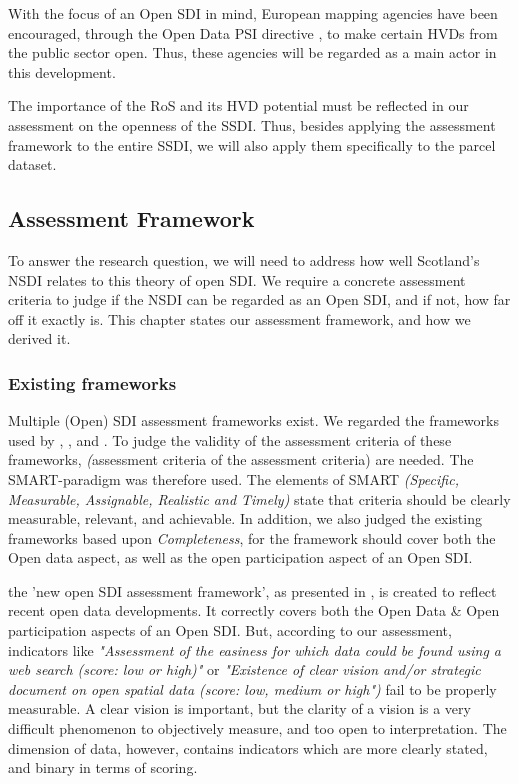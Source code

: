 With the focus of an Open SDI in mind, European mapping agencies have been encouraged, through the Open Data PSI directive \citep{open_data_directive_2019}, to make certain HVDs from the public sector open. Thus, these agencies will be regarded as a main actor in this development. 

The importance of the RoS and its HVD potential must be reflected in our assessment on the openness of the SSDI. Thus, besides applying the assessment framework to the entire SSDI, we will also apply them specifically to the parcel dataset. 

\subsection{Assessment Framework}

To answer the research question, we will need to address how well Scotland's NSDI relates to this theory of open SDI. We require a concrete assessment criteria to judge if the NSDI can be regarded as an Open SDI, and if not, how far off it exactly is. This chapter states our assessment framework, and how we derived it. 

\subsubsection{Existing frameworks}

Multiple (Open) SDI assessment frameworks exist. We regarded the frameworks used by \citet{assessing_openness_SDI_2018}, \citet{mulder}, and \citet{olausson}. 
To judge the validity of the assessment criteria of these frameworks, \textit(assessment criteria of the assessment criteria) are needed. The SMART-paradigm \citep{smart_1981} was therefore used. The elements of SMART \textit{(Specific, Measurable, Assignable, Realistic and Timely)} state that criteria should be clearly measurable, relevant, and achievable. In addition, we also judged the existing frameworks based upon \textit{Completeness}, for the framework should cover both the Open data aspect, as well as the open participation aspect of an Open SDI. 

the 'new open SDI assessment framework', as presented in \citet{assessing_openness_SDI_2018}, is created to reflect recent open data developments. It correctly covers both the Open Data \& Open participation aspects of an Open SDI. But, according to our assessment, indicators like \textit{"Assessment of the easiness for which data could be found using a web search (score: low or high)"} or \textit{"Existence of clear vision and/or strategic document on open spatial data (score: low, medium or high")} fail to be properly measurable. A clear vision is important, but the clarity of a vision is a very difficult phenomenon to objectively measure, and too open to interpretation. The dimension of data, however, contains indicators which are more clearly stated, and binary in terms of scoring. 

